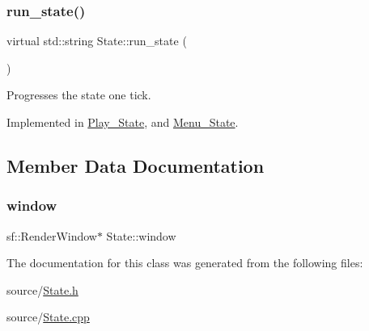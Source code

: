 \subsubsection{\texorpdfstring{run\+\_\+state()}{run\_state()}}
{\footnotesize\ttfamily virtual std\+::string State\+::run\+\_\+state (\begin{DoxyParamCaption}{ }\end{DoxyParamCaption})\hspace{0.3cm}{\ttfamily [pure virtual]}}

Progresses the state one tick. 

Implemented in \hyperlink{classPlay__State_a209137246f75ba4bd2b5f9906d9317e6}{Play\+\_\+\+State}, and \hyperlink{classMenu__State_a727db35b408300360c261db80399088e}{Menu\+\_\+\+State}.



\subsection{Member Data Documentation}
\mbox{\label{classState_ae6259a383c98ae7496266a76a9daf478}} 
\subsubsection{\texorpdfstring{window}{window}}
{\footnotesize\ttfamily sf\+::\+Render\+Window$\ast$ State\+::window\hspace{0.3cm}{\ttfamily [protected]}}



The documentation for this class was generated from the following files\+:\begin{DoxyCompactItemize}
\item 
source/\hyperlink{State_8h}{State.\+h}\item 
source/\hyperlink{State_8cpp}{State.\+cpp}\end{DoxyCompactItemize}

